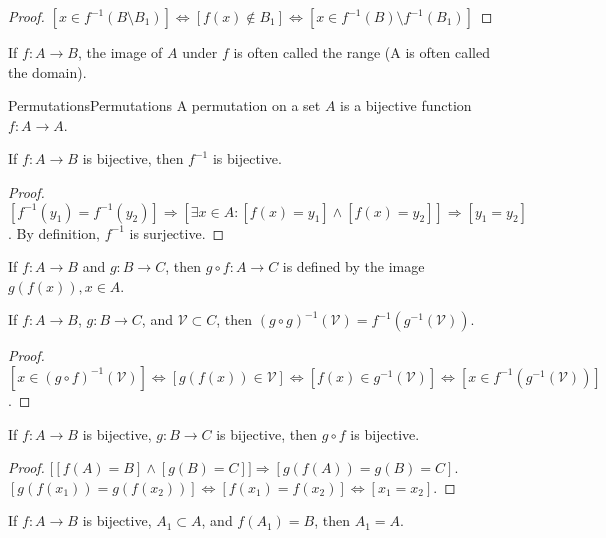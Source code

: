         \begin{proof}
        $[x\in f^{-1}(B\setminus B_1)]\Leftrightarrow [f(x)\notin B_1]\Leftrightarrow [x\in f^{-1}(B)\setminus f^{-1}(B_1)]$
        \end{proof}
        If $f:A\rightarrow B$, the image of $A$ under $f$
        is often called the range (A is often called the domain).
        \begin{ldefinition}{Permutations}{Permutations}
            A permutation on a set $A$ is a bijective function
            $f:A\rightarrow{A}$.
        \end{ldefinition}
        \begin{theorem}
        If $f:A\rightarrow B$ is bijective, then $f^{-1}$ is bijective.
        \end{theorem}
        \begin{proof}
        $[f^{-1}(y_1) = f^{-1}(y_2)]\Rightarrow [\exists x\in A:[f(x) = y_1]\land [f(x)=y_2]]\Rightarrow [y_1=y_2]$. By definition, $f^{-1}$ is surjective.
        \end{proof}
        \begin{definition}
        If $f:A\rightarrow B$ and $g:B\rightarrow C$, then $g\circ f:A\rightarrow C$ is defined by the image $g(f(x)), x\in A$. 
        \end{definition}
        \begin{theorem}
        If $f:A\rightarrow B$, $g:B\rightarrow C$, and $\mathcal{V}\subset C$, then $(g\circ g)^{-1}(\mathcal{V}) = f^{-1}(g^{-1}(\mathcal{V}))$.
        \end{theorem}
        \begin{proof}
        $[x\in (g\circ f)^{-1}(\mathcal{V})]\Leftrightarrow [g(f(x))\in \mathcal{V}] \Leftrightarrow [f(x)\in g^{-1}(\mathcal{V})]\Leftrightarrow [x\in f^{-1}(g^{-1}(\mathcal{V}))]$.
        \end{proof}
        \begin{theorem}
        If $f:A\rightarrow B$ is bijective, $g:B\rightarrow C$ is bijective, then $g\circ f$ is bijective.
        \end{theorem}
        \begin{proof}
        $\big[[f(A) = B]\land [g(B) = C]\big]\Rightarrow [g(f(A)) = g(B) = C]$. $[g(f(x_1))=g(f(x_2))]\Leftrightarrow [f(x_1)=f(x_2)]\Leftrightarrow [x_1=x_2]$.
        \end{proof}
        \begin{theorem}
        If $f:A\rightarrow B$ is bijective, $A_1\subset A$, and $f(A_1) = B$, then $A_1=A$.
        \end{theorem}
